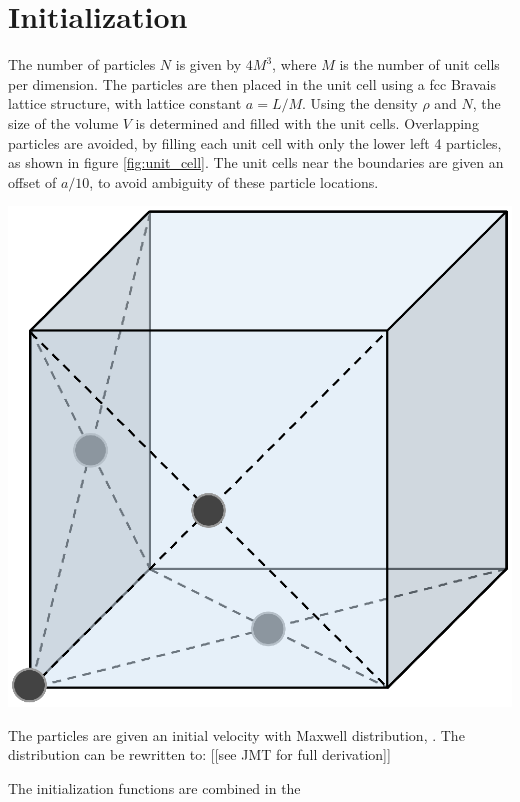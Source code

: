 \section{Initialization}
The number of particles $N$ is given by $4M^3$, where $M$ is the number of unit cells per dimension. The particles are then placed in the unit cell using a fcc Bravais lattice structure, with lattice constant $a=L/M$. Using the density $\rho$ and $N$, the size of the volume $V$ is determined and filled with the unit cells. Overlapping particles are avoided, by filling each unit cell with only the lower left 4 particles, as shown in figure \ref{fig:unit_cell}. The unit cells near the boundaries are given an offset of $a/10$, to avoid ambiguity of these particle locations.
\begin{Figure}
 \centering
 \includegraphics[width=0.35\linewidth]{fcc_cell.eps}
 \label{fig:unit_cell}
\end{Figure}

The particles are given an initial velocity with Maxwell distribution, $ $. The distribution can be rewritten to: [[see JMT for full derivation]]

The initialization functions are combined in the 